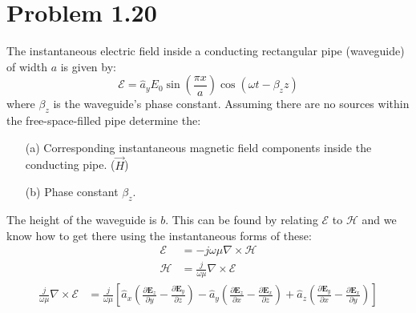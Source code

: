 \documentclass[12pt]{article}
\begin{document}
\section*{Problem 1.20}
The instantaneous electric field inside a conducting rectangular pipe (waveguide) of width \( a \) is given by:
\[
\bm{\mathcal{E}} = \hat{a}_y E_0 \sin\left(\frac{\pi x}{a}\right) \cos(\omega t - \beta_z z)
\]
where \( \beta_z \) is the waveguide's phase constant. Assuming there are no sources within the free-space-filled pipe determine the:
\begin{itemize}
\item[(a)] Corresponding instantaneous magnetic field components inside the conducting pipe. ($\vec{H}$)\\
\item[(b)] Phase constant \( \beta_z \).
\end{itemize}
The height of the waveguide is \( b \).
This can be found by relating $\bm{\mathcal{E}}$ to $\bm{\mathcal{H}}$ and we know how to get there using the instantaneous forms of these:
\begin{align*}
  \bm{\mathcal{E}} &= -j \omega\mu\nabla \times \bm{\mathcal{H}} \\
  \bm{\mathcal{H}} &= \frac{j}{\omega\mu}\nabla \times \bm{\mathcal{E}}
\end{align*}
\begin{align*}
  \frac{j}{\omega\mu}  \nabla \times \bm{\mathcal{E}} &=  \frac{j}{\omega\mu} \left[\hat a_x\left(\frac{\partial\bm{E}_z}{\partial y} - \frac{\partial\bm{E}_y}{\partial z}\right) - \hat a_y\left( \frac{\partial\bm{E}_z}{\partial x} - \frac{\partial\bm{E}_x}{\partial z}  \right) + \hat a_z\left( \frac{\partial\bm{E}_y}{\partial x} -  \frac{\partial\bm{E}_x}{\partial y}\right)\right]
\end{align*}
\end{document}

